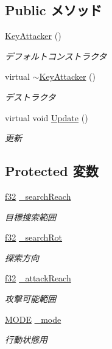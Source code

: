 \subsection*{Public メソッド}
\begin{DoxyCompactItemize}
\item 
\hyperlink{class_key_attacker_ab2e023e688b24771a6bd1fbe2c07294e}{Key\-Attacker} ()
\begin{DoxyCompactList}\small\item\em デフォルトコンストラクタ \end{DoxyCompactList}\item 
virtual \hyperlink{class_key_attacker_a8d755855ed52db20f852a33728ddc612}{$\sim$\-Key\-Attacker} ()
\begin{DoxyCompactList}\small\item\em デストラクタ \end{DoxyCompactList}\item 
virtual void \hyperlink{class_key_attacker_a274203ec57ef80b07d3816570c9588e4}{Update} ()
\begin{DoxyCompactList}\small\item\em 更新 \end{DoxyCompactList}\end{DoxyCompactItemize}
\subsection*{Protected 変数}
\begin{DoxyCompactItemize}
\item 
\hyperlink{_main_8h_a5f6906312a689f27d70e9d086649d3fd}{f32} \hyperlink{class_key_attacker_ad9928ab6bf533ef686477cf4dc1574a2}{\-\_\-search\-Reach}
\begin{DoxyCompactList}\small\item\em 目標捜索範囲 \end{DoxyCompactList}\item 
\hyperlink{_main_8h_a5f6906312a689f27d70e9d086649d3fd}{f32} \hyperlink{class_key_attacker_af84b632fc711f0b24cc0a8ffacc0a0d5}{\-\_\-search\-Rot}
\begin{DoxyCompactList}\small\item\em 探索方向 \end{DoxyCompactList}\item 
\hyperlink{_main_8h_a5f6906312a689f27d70e9d086649d3fd}{f32} \hyperlink{class_key_attacker_a20541471e6d38fcbe019f5bc60652275}{\-\_\-attack\-Reach}
\begin{DoxyCompactList}\small\item\em 攻撃可能範囲 \end{DoxyCompactList}\item 
\hyperlink{class_key_attacker_a921f9ecc037fd96882bc46418c68cb95}{M\-O\-D\-E} \hyperlink{class_key_attacker_a666924d4aac349f5ac2d6d340d1c8637}{\-\_\-mode}
\begin{DoxyCompactList}\small\item\em 行動状態用 \end{DoxyCompactList}\end{DoxyCompactItemize}


